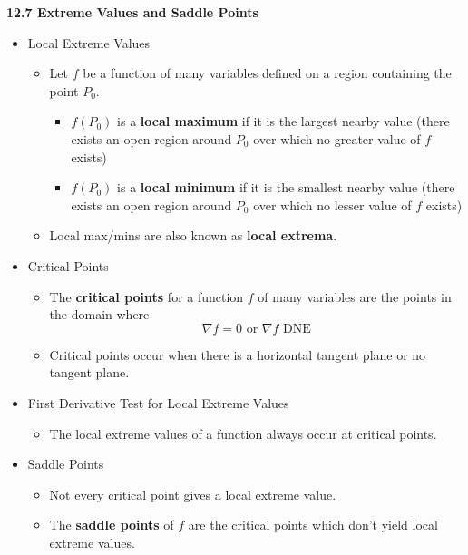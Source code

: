 \documentclass[12pt]{article}
\newcommand{\<}{\left<}
\renewcommand{\>}{\right>}
\begin{document}
\newpage

\centerline{\bf 12.7 Extreme Values and Saddle Points}

\begin{itemize}

  \item Local Extreme Values
  
    \begin{itemize}
    \item Let $f$ be a function of many variables defined on a region containing the point $P_0$.
      \begin{itemize}
      \item $f(P_0)$ is a \textbf{local maximum} if it is the largest nearby value (there exists an open region around $P_0$ over which no greater value of $f$ exists)
      \item $f(P_0)$ is a \textbf{local minimum} if it is the smallest nearby value (there exists an open region around $P_0$ over which no lesser value of $f$ exists)
      \end{itemize}
    \item Local max/mins are also known as \textbf{local extrema}.
    \end{itemize}

  \item Critical Points
    \begin{itemize}
      \item
        The \textbf{critical points} for a function $f$ of many variables are the points in the domain where 
          \[
            \nabla f = 0 \text{ or } \nabla f \text{ DNE}
          \]
      \item
        Critical points occur when there is a horizontal tangent plane or no tangent plane.
    \end{itemize}
    
  \item First Derivative Test for Local Extreme Values
  
    \begin{itemize}
      \item
        The local extreme values of a function always occur at critical points.
    \end{itemize}
    
  \item Saddle Points
  
    \begin{itemize}
      \item 
        Not every critical point gives a local extreme value.
      \item 
        The \textbf{saddle points} of $f$ are the critical points which don't yield local extreme values.
    \end{itemize}
    

\end{itemize}
\end{document}
